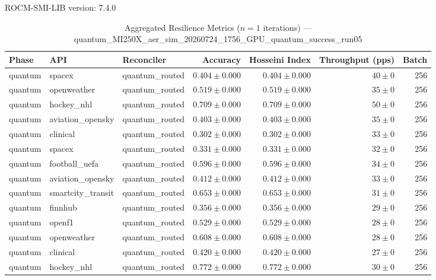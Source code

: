 ROCM-SMI-LIB version: 7.4.0

\begin{table}[htbp]
\caption{Aggregated Resilience Metrics ($n=1$ iterations) --- quantum_MI250X_aer_sim_20260724_1756_GPU_quantum_success_run05}
\begin{tabular}{l l l r r r r}
\hline
Phase & API & Reconciler & Accuracy & Hosseini Index & Throughput (pps) & Batch \\
\hline
quantum & spacex & quantum\_routed & $0.404\pm0.000$ & $0.404\pm0.000$ & $40\pm0$ & 256 \\
quantum & openweather & quantum\_routed & $0.519\pm0.000$ & $0.519\pm0.000$ & $35\pm0$ & 256 \\
quantum & hockey\_nhl & quantum\_routed & $0.709\pm0.000$ & $0.709\pm0.000$ & $50\pm0$ & 256 \\
quantum & aviation\_opensky & quantum\_routed & $0.403\pm0.000$ & $0.403\pm0.000$ & $35\pm0$ & 256 \\
quantum & clinical & quantum\_routed & $0.302\pm0.000$ & $0.302\pm0.000$ & $33\pm0$ & 256 \\
quantum & spacex & quantum\_routed & $0.331\pm0.000$ & $0.331\pm0.000$ & $32\pm0$ & 256 \\
quantum & football\_uefa & quantum\_routed & $0.596\pm0.000$ & $0.596\pm0.000$ & $34\pm0$ & 256 \\
quantum & aviation\_opensky & quantum\_routed & $0.412\pm0.000$ & $0.412\pm0.000$ & $33\pm0$ & 256 \\
quantum & smartcity\_transit & quantum\_routed & $0.653\pm0.000$ & $0.653\pm0.000$ & $31\pm0$ & 256 \\
quantum & finnhub & quantum\_routed & $0.356\pm0.000$ & $0.356\pm0.000$ & $29\pm0$ & 256 \\
quantum & openf1 & quantum\_routed & $0.529\pm0.000$ & $0.529\pm0.000$ & $28\pm0$ & 256 \\
quantum & openweather & quantum\_routed & $0.608\pm0.000$ & $0.608\pm0.000$ & $28\pm0$ & 256 \\
quantum & clinical & quantum\_routed & $0.420\pm0.000$ & $0.420\pm0.000$ & $27\pm0$ & 256 \\
quantum & hockey\_nhl & quantum\_routed & $0.772\pm0.000$ & $0.772\pm0.000$ & $30\pm0$ & 256 \\

\end{tabular}
\end{table}
